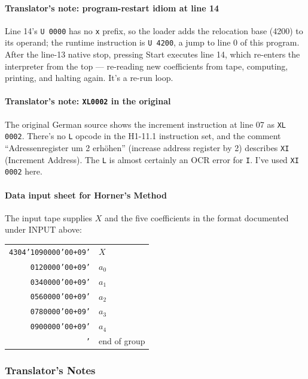\medskip
\paragraph{Translator's note: program-restart idiom at line 14}
Line 14's \texttt{U 0000} has no \texttt{x} prefix, so the loader adds the relocation base (4200) to its operand; the runtime instruction is \texttt{U 4200}, a jump to line 0 of this program. After the line-13 native stop, pressing \textsf{Start} executes line 14, which re-enters the interpreter from the top --- re-reading new coefficients from tape, computing, printing, and halting again. It's a re-run loop.

\paragraph{Translator's note: \texttt{XL0002} in the original}
The original German source shows the increment instruction at line 07 as \texttt{XL 0002}. There's no \texttt{L} opcode in the H1-11.1 instruction set, and the comment ``Adressenregister um 2 erh\"ohen'' (increase address register by 2) describes \texttt{XI} (Increment Address). The \texttt{L} is almost certainly an OCR error for \texttt{I}. I've used \texttt{XI 0002} here.

\paragraph{Data input sheet for Horner's Method}
The input tape supplies $X$ and the five coefficients in the format documented under INPUT above:

\medskip
\noindent
\small
\ttfamily
\begin{tabular}{ll}
\texttt{4304'1090000'00+09'} & $X$ \\
\texttt{\ \ \ \ \ 0120000'00+09'} & $a_0$ \\
\texttt{\ \ \ \ \ 0340000'00+09'} & $a_1$ \\
\texttt{\ \ \ \ \ 0560000'00+09'} & $a_2$ \\
\texttt{\ \ \ \ \ 0780000'00+09'} & $a_3$ \\
\texttt{\ \ \ \ \ 0900000'00+09'} & $a_4$ \\
\texttt{\ \ \ \ \ \ \ \ \ \ \ \ \ \ \ \ \ \ '} & end of group \\
\end{tabular}
\normalsize

\subsubsection*{Translator's Notes}

